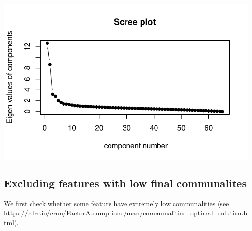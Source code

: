 \documentclass[
  letterpaper,
  DIV=11,
  numbers=noendperiod]{scrreprt}
\newenvironment{Shaded}{\begin{snugshade}}{\end{snugshade}}
\newcommand{\AttributeTok}[1]{\textcolor[rgb]{0.40,0.45,0.13}{#1}}
\newcommand{\CommentTok}[1]{\textcolor[rgb]{0.37,0.37,0.37}{#1}}
\newcommand{\DecValTok}[1]{\textcolor[rgb]{0.68,0.00,0.00}{#1}}
\newcommand{\FunctionTok}[1]{\textcolor[rgb]{0.28,0.35,0.67}{#1}}
\newcommand{\NormalTok}[1]{\textcolor[rgb]{0.00,0.23,0.31}{#1}}
\newcommand{\OtherTok}[1]{\textcolor[rgb]{0.00,0.23,0.31}{#1}}
\newcommand{\SpecialCharTok}[1]{\textcolor[rgb]{0.37,0.37,0.37}{#1}}
\newcommand{\StringTok}[1]{\textcolor[rgb]{0.13,0.47,0.30}{#1}}
\begin{document}
\includegraphics{E_Ch6_Analysis_files/figure-pdf/screeplot-1.pdf}

\begin{Shaded}
\end{Shaded}

\subsection{Excluding features with low final
communalites}\label{excluding-features-with-low-final-communalites}

We first check whether some feature have extremely low communalities
(see
\href{https://rdrr.io/cran/FactorAssumptions/man/communalities_optimal_solution.htmlhttps://rdrr.io/cran/FactorAssumptions/man/communalities_optimal_solution.html}{https://rdrr.io/cran/FactorAssumptions/man/communalities\_optimal\_solution.html}).
\end{document}
